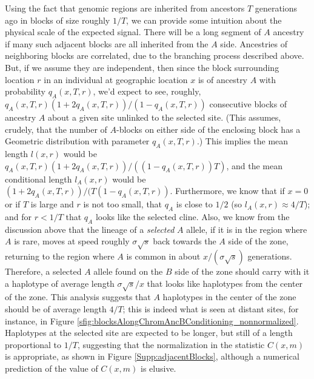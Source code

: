 \documentclass[11pt,letterpaper]{article}
\newcommand{\alisa}[1]{{\em \color{red} #1}}
\begin{document}
Using the fact that genomic regions are inherited from ancestors $T$ generations ago
in blocks of size roughly $1/T$, 
we can provide some intuition about the physical scale of the expected signal.
There will be a long segment of $A$ ancestry
if many such adjacent blocks are all inherited from the $A$ side.
Ancestries of neighboring blocks are correlated,
due to the branching process described above. 
But, if we assume they are independent, 
then since the block surrounding location $r$ in an individual at geographic location $x$ is of ancestry $A$ with probability $q_A(x,T,r)$,
we'd expect to see, roughly, 
$q_A(x,T,r)(1+2q_A(x,T,r))/(1-q_A(x,T,r))$ 
consecutive blocks of ancestry $A$ about a given site unlinked to the selected site.
(This assumes, crudely, that the number of $A$-blocks on either side of the enclosing block
has a Geometric distribution with parameter $q_A(x,T,r)$.)
This implies the mean length $l(x,r)$ would be $q_A(x,T,r)(1+2q_A(x,T,r))/((1-q_A(x,T,r))T)$,
and the mean conditional length $l_A(x,r)$ would be $(1+2q_A(x,T,r))/(T(1-q_A(x,T,r))$.
Furthermore, we know that if $x=0$ or if $T$ is large and $r$ is not too small, that $q_A$ is close to $1/2$
(so $l_A(x,r) \approx 4/T$);
and for $r<1/T$ that $q_A$ looks like the selected cline.
Also, we know from the discussion above that the lineage of a \emph{selected} $A$ allele,
if it is in the region where $A$ is rare,
moves at speed roughly $\sigma \sqrt{s}$ back towards the $A$ side of the zone,
returning to the region where $A$ is common in about $x/(\sigma \sqrt{s})$ generations.
Therefore, a selected $A$ allele found on the $B$ side of the zone
should carry with it a haplotype of average length $\sigma \sqrt{s}/x$
that looks like haplotypes from the center of the zone.
This analysis suggests that $A$ haplotypes in the center of the zone should be of average length $4/T$;
this is indeed what is seen at distant sites, for instance, in Figure \ref{sfig:blocksAlongChromAncBConditioning_nonnormalized}.
Haplotypes at the selected site are expected to be longer, but still of a length proportional to $1/T$,
suggesting that the normalization in the statistic $C(x,m)$ is appropriate,
as shown in Figure \ref{Supp:adjacentBlocks},
although a numerical prediction of the value of $C(x,m)$ is elusive.
\end{document}
